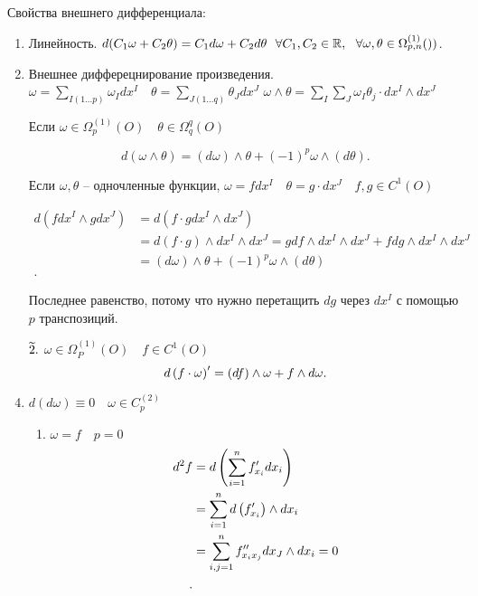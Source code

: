 Свойства внешнего дифференциала:
\begin{enumerate}
    \item Линейность. $d(C_1 \omega + C_2 \theta ) = C_1 d\omega + C_2 d\theta ~~ \forall C_1, C_2\in \mathbb{R},~~ \forall \omega, \theta \in \Omega_{p, n}^{(1)} ())$.
    \item Внешнее дифферецнирование произведения. $\omega = \sum_{I(1\ldots p)} \omega_Idx^I\quad \theta = \sum_{J(1\ldots q)} \theta_Jdx^J$
    $\omega \wedge \theta = \sum_I\sum_J \omega_I\theta_j \cdot dx^I\wedge dx^J$

    Если $\omega\in \Omega_p^{(1)}(O)\quad \theta\in \Omega_q^q(O)$

    \[
    d\left( \omega\wedge \theta \right)  = (d\omega)\wedge \theta + (-1)^p\omega \wedge \left( d\theta \right) 
    .\] 

    Если $\omega, \theta$ -- одночленные функции, $\omega = fdx^I\quad \theta = g \cdot dx^J\quad f, g\in C^1(O) $

    \begin{align*}
        d\left( fdx^I\wedge gdx^J \right) &= d\left( f\cdot g dx^I\wedge dx^J \right)  \\
        &= d\left( f\cdot g \right)\wedge dx^I\wedge dx^J =  gdf\wedge dx^I\wedge dx^J + fdg\wedge dx^I\wedge dx^J  \\
        &= (d\omega)\wedge \theta + (-1)^p\omega \wedge \left( d\theta \right) \\
    .\end{align*}

    Последнее равенство, потому что нужно перетащить $dg$ через $dx^I$ с помощью $p$ транспозиций.

    \item [$\widetilde{2}.$] $\omega\in \Omega_P^{(1)}(O)\quad f\in C^1(O)$
    \[
    d\left( f\cdot \omega \right)^{\prime} = \left( df \right) \wedge \omega + f\wedge d\omega
    .\] 
    \item $d\left( d\omega \right) \equiv 0\quad \omega\in C_p^{(2)}$
    \begin{enumerate}
        \item $\omega = f\quad p = 0$
        \begin{align*}
        d^2f &=  d\left( \sum_{i=1}^{n} \p f_{x_i}dx_i \right)\\
        &=  \sum_{i=1}^{n} d\left( \p f_{x_i} \right) \wedge dx_i\\
        &= \sum_{i,j=1}^{n} \pp f_{x_ix_j}dx_J\wedge dx_i = 0 \\
        .\end{align*}
    \end{enumerate}
\end{enumerate}

